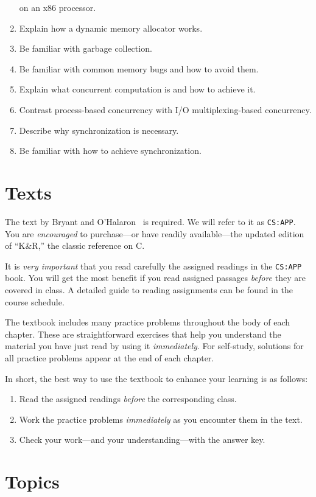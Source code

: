 \documentclass[11pt]{article}
\begin{document}
\begin{enumerate}
  on an x86 processor.
\item Explain how a dynamic memory allocator works.
\item Be familiar with garbage collection.
\item Be familiar with common memory bugs and how to avoid them.
\item Explain what concurrent computation is and how to achieve it.
\item Contrast process-based concurrency with I/O multiplexing-based
  concurrency.
\item Describe why synchronization is necessary.
\item Be familiar with how to achieve synchronization.
\end{enumerate}

\section{Texts}

The text by Bryant and O'Halaron~\cite{cs:app3} is required.
We will refer to it as \texttt{CS:APP}.
You are \emph{encouraged} to purchase---or have readily available---the
updated edition of ``K\&R,'' the classic reference on C.\cite{k&r}

It is \emph{very important} that you read carefully
the assigned readings in the \texttt{CS:APP} book.
You will get the most benefit if you read assigned passages
\emph{before} they are covered in class.
A detailed guide to reading assignments can be found in the course schedule.

The textbook includes many practice problems throughout the body of each
chapter. These are straightforward exercises that help you understand the
material you have just read by using it \emph{immediately}. For self-study,
solutions for all practice problems appear at the end of each chapter.

In short, the best way to use the textbook to enhance your learning is as
follows:
\begin{enumerate}
\item Read the assigned readings \emph{before} the corresponding class.
\item Work the practice problems \emph{immediately} as you encounter them in
  the text.
\item Check your work—and your understanding—with the answer key.
\end{enumerate}

\section{Topics}
\end{document}
